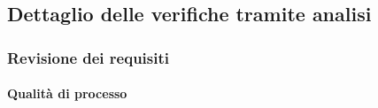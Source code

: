 \subsection{Dettaglio delle verifiche tramite analisi}

	\subsubsection{Revisione dei requisiti}
		\paragraph{Qualità di processo}


